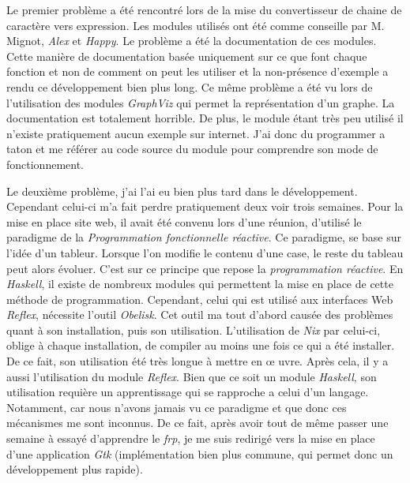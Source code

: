 \vphantom{}

Le premier problème a été rencontré lors de la mise du convertisseur de chaine 
de caractère vers expression. Les modules utilisés ont été comme conseille par 
M. Mignot, \textit{Alex} et \textit{Happy}. Le problème a été la documentation 
de ces modules. Cette manière de documentation basée uniquement sur ce que font 
chaque fonction et non de comment on peut les utiliser et la non-présence 
d'exemple a rendu ce développement bien plus long. Ce même problème a été vu 
lors de l'utilisation des modules \textit{GraphViz} qui permet la représentation
d'un graphe. La documentation est totalement horrible. De plus, le module étant 
très peu utilisé il n'existe pratiquement aucun exemple sur internet. J'ai donc
du programmer a taton et me référer au code source du module pour comprendre 
son mode de fonctionnement.

\vphantom{}

Le deuxième problème, j'ai l'ai eu bien plus tard dans le développement. 
Cependant celui-ci m’a fait perdre pratiquement deux voir trois semaines. Pour 
la mise en place site web, il avait été convenu lors d'une réunion, d'utilisé 
le paradigme de la \textit{Programmation fonctionnelle réactive}. Ce paradigme, 
se base sur l'idée d'un tableur. Lorsque l'on modifie le contenu d'une case, le 
reste du tableau peut alors évoluer. C'est sur ce principe que repose la 
\textit{programmation réactive}. En \textit{Haskell}, il existe de nombreux 
modules qui permettent la mise en place de cette méthode de programmation. 
Cependant, celui qui est utilisé aux interfaces Web \textit{Reflex}, nécessite 
l'outil \textit{Obelisk}. Cet outil ma tout d'abord causée des problèmes quant 
à son installation, puis son utilisation. L'utilisation de \textit{Nix} 
par celui-ci, oblige à chaque installation, de compiler au moins une fois ce qui 
a été installer. De ce fait, son utilisation été très longue à mettre en \oe 
uvre. Après cela, il y a aussi l'utilisation du module \textit{Reflex}. Bien que
ce soit un module \textit{Haskell}, son utilisation requière un apprentissage
qui se rapproche a celui d'un langage. Notamment, car nous n'avons jamais vu ce 
paradigme et que donc ces mécanismes me sont inconnus. De ce fait, après avoir 
tout de même passer une semaine à essayé d'apprendre le \textit{frp}, je me suis 
redirigé vers la mise en place d'une application \textit{Gtk} (implémentation 
bien plus commune, qui permet donc un développement plus rapide).  

\vphantom{}

